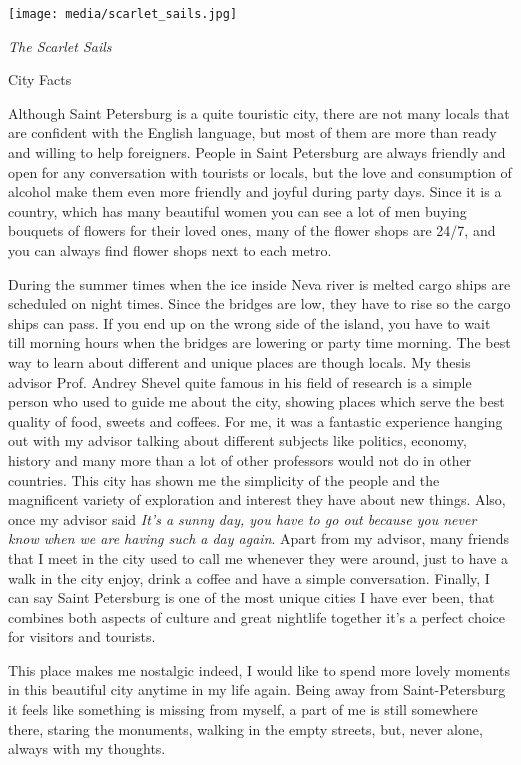 \documentclass[10pt,a4paper]{article} %
\newcommand{\NewsItem}[1]{ %
\usefont{T1}{fvs}{n}{n} %
\vspace{24pt}\large #1\vspace{3pt} %
\par \normalsize \normalfont}
\begin{document}
\begin{multicols}{3}
\begin{center}
	\texttt{[image: media/scarlet\_sails.jpg]}
	\par\textit{The Scarlet Sails}
\end{center}

\NewsItem{City Facts}
Although Saint Petersburg is a quite touristic city, 
there are not many locals that are confident with the English language,
but most of them are more than ready and willing to help foreigners. 
People in Saint Petersburg are always friendly and open for any conversation 
with tourists or locals, but the love and consumption of alcohol make them even 
more friendly and joyful during party days. 
Since it is a country, which has many beautiful women you can see a lot of men 
buying bouquets of flowers for their loved ones, 
many of the flower shops are 24/7, and you can always find flower shops next to each metro.

During the summer times when the ice inside Neva river is melted cargo ships are 
scheduled on night times. 
Since the bridges are low, they have to rise so the cargo ships can pass. 
If you end up on the wrong side of the island, 
you have to wait till morning hours when the bridges are lowering or party time morning.
The best way to learn about different and unique places are though locals. 
My thesis advisor Prof. Andrey Shevel quite famous in his field of research 
is a simple person who used to guide me about the city, 
showing places which serve the best quality of food, sweets and coffees. 
For me, it was a fantastic experience hanging out with 
my advisor talking about different subjects like politics, economy, 
history and many more than a lot of other professors would not do in other countries. 
This city has shown me the simplicity of the people and the magnificent variety of exploration 
and interest they have about new things. 
Also, once my advisor said \textit{It's a sunny day, 
	you have to go out because you never know when we are having such a day again}. 
Apart from my advisor, many friends that I meet in the city used to call 
me whenever they were around, just to have a walk in the city enjoy, 
drink a coffee and have a simple conversation. 
Finally, I can say Saint Petersburg is one of the most unique cities I have ever been, 
that combines both aspects of culture and great nightlife together
it's a perfect choice for visitors and tourists.

This place makes me nostalgic indeed, 
I would like to spend more lovely moments in this beautiful city anytime in my life again. Being away from Saint-Petersburg it feels like something is missing from myself, a part of me is still somewhere there, staring the monuments, walking in the empty streets, but, never alone, always with my thoughts.





\end{multicols}
\end{document}
